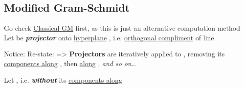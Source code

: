 \subsection*{Modified Gram-Schmidt}

\begin{itemize}

      \vItem
            Go check \underline{Classical GM} first, as this is just an alternative computation method
      \vItem
            Let
            be \textbf{\emph{projector}} onto \underline{hyperplane} ,
            i.e. \underline{orthogonal compliment} of line 

            \begin{itemize}

                  \vItem
                        Notice:
                  \vItem
                        Re-state:
                        =>
                  \vItem
                        \textbf{Projectors} 
                        are iteratively applied to , removing its \underline{components along} ,
                        then \underline{along} , \emph{and so on\ldots{}}
            \end{itemize}
      \vItem
            Let ,
            i.e.  \textbf{\emph{without}} its \underline{components along} 

            \begin{itemize}


\end{itemize}
\end{itemize}
